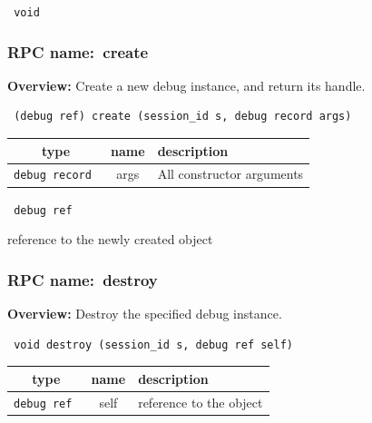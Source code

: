 \vspace{0.3cm}

{\tt 
void
}



\vspace{0.3cm}
\vspace{0.3cm}
\vspace{0.3cm}
\subsubsection{RPC name:~create}

{\bf Overview:} 
Create a new debug instance, and return its handle.

\begin{verbatim} (debug ref) create (session_id s, debug record args)\end{verbatim}



 
\vspace{0.3cm}
\begin{tabular}{|c|c|p{7cm}|}
 \hline
{\bf type} & {\bf name} & {\bf description} \\ \hline
{\tt debug record } & args & All constructor arguments \\ \hline 

\end{tabular}

\vspace{0.3cm}

{\tt 
debug ref
}


reference to the newly created object
\vspace{0.3cm}
\vspace{0.3cm}
\vspace{0.3cm}
\subsubsection{RPC name:~destroy}

{\bf Overview:} 
Destroy the specified debug instance.

\begin{verbatim} void destroy (session_id s, debug ref self)\end{verbatim}



 
\vspace{0.3cm}
\begin{tabular}{|c|c|p{7cm}|}
 \hline
{\bf type} & {\bf name} & {\bf description} \\ \hline
{\tt debug ref } & self & reference to the object \\ \hline 

\end{tabular}

